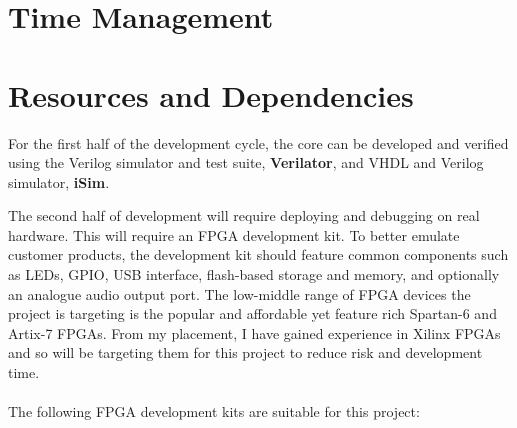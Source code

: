 \documentclass[11pt,a4paper]{report}
\begin{document}

\section{Time Management}
\label{sect:proj_time}

\section{Resources and Dependencies}
For the first half of the development cycle, the core can be developed and verified using the Verilog simulator and test suite, \textbf{Verilator}, and VHDL and Verilog simulator, \textbf{iSim}.

The second half of development will require deploying and debugging on real hardware. This will require an FPGA development kit. To better emulate customer products, the development kit should feature common components such as LEDs, GPIO, USB interface, flash-based storage and memory, and optionally an analogue audio output port. The low-middle range of FPGA devices the project is targeting is the popular and affordable yet feature rich Spartan-6 and Artix-7 FPGAs. From my placement, I have gained experience in Xilinx FPGAs and so will be targeting them for this project to reduce risk and development time.
\\\\
The following FPGA development kits are suitable for this project:
\end{document}

